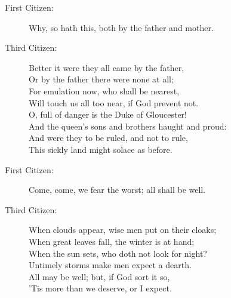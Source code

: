 \documentclass{article}
\begin{document}
\begin{description}
\item[First Citizen:] 
\hspace{1pt}Why, so hath this, both by the father and mother.\\
\end{description}
\begin{description}
\item[Third Citizen:] 
\hspace{1pt}Better it were they all came by the father,\\
\hspace{1pt}Or by the father there were none at all;\\
\hspace{1pt}For emulation now, who shall be nearest,\\
\hspace{1pt}Will touch us all too near, if God prevent not.\\
\hspace{1pt}O, full of danger is the Duke of Gloucester!\\
\hspace{1pt}And the queen's sons and brothers haught and proud:\\
\hspace{1pt}And were they to be ruled, and not to rule,\\
\hspace{1pt}This sickly land might solace as before.\\
\end{description}
\begin{description}
\item[First Citizen:] 
\hspace{1pt}Come, come, we fear the worst; all shall be well.\\
\end{description}
\begin{description}
\item[Third Citizen:] 
\hspace{1pt}When clouds appear, wise men put on their cloaks;\\
\hspace{1pt}When great leaves fall, the winter is at hand;\\
\hspace{1pt}When the sun sets, who doth not look for night?\\
\hspace{1pt}Untimely storms make men expect a dearth.\\
\hspace{1pt}All may be well; but, if God sort it so,\\
\hspace{1pt}'Tis more than we deserve, or I expect.\\
\end{description}
\end{document}
